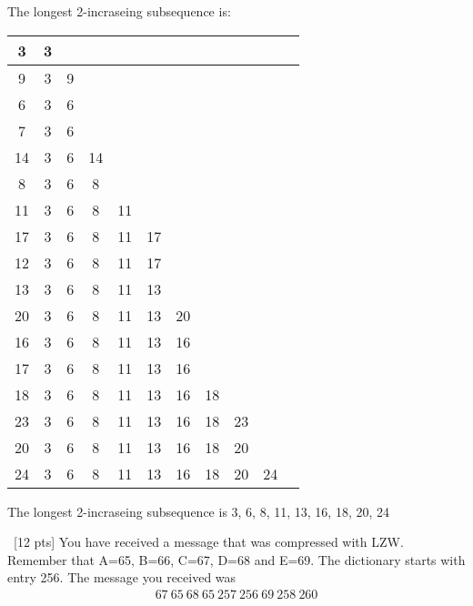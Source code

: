 \documentclass[12pt]{article}
\newenvironment{sol}[1][Solution]{\begin{trivlist}\item[\hskip\labelsep {\bfseries #1:}]}{\end{trivlist}}
\begin{document}
\begin{enumerate}
    The longest 2-incraseing subsequence is:
    \begin{sol}
    \hspace*{\fill}
    \begin{center}
        \begin{tabular}{|c|c|c|c|c|c|c|c|c|c|c|}
        \hline
             3& 3& & & & & & & & & \\
                     \hline
             9& 3& 9 & & & & & & & & \\
                     \hline
             6& 3& 6 & & & & & & & & \\
                     \hline
             7 & 3& 6& & & & & & & & \\
                     \hline
             14 & 3& 6& 14& & & & & & & \\
                     \hline
             8& 3& 6& 8 & & & & & & & \\
                     \hline
             11& 3&6 &8 & 11& & & & & & \\
                     \hline
             17 & 3& 6 & 8 &11 &17 & &  & & & \\
                     \hline
             12 & 3& 6 & 8& 11&17 & & & & & \\
                     \hline
             13&  3& 6&8 & 11& 13& & & & & \\
                     \hline
             20 & 3&6 &8 &11 &13 & 20& & & & \\
                     \hline
             16& 3&6 &8 &11 &13 &16 &&  & & \\
                     \hline
             17 & 3&6 &8 &11 & 13&16 & & & & \\
                     \hline
             18&  3&6 &8 &11 &13 & 16&18 & & & \\
                     \hline
             23 & 3&6 &8 &11 & 13&16 &18 &23 & & \\
                     \hline
             20&  3&6 &8 &11 & 13&16 &18 & 20& & \\
                     \hline
             24&  3&6 &8 &11 & 13&16 &18 &20 & 24 & \\
                     \hline
        \end{tabular}
    \end{center}
    The longest 2-incraseing subsequence is 3, 6, 8, 11, 13, 16, 18, 20, 24 
    \end{sol}

    \item \ [12 pts] You have received a message that was compressed with LZW. Remember that A=65, B=66, C=67, D=68 and E=69. The dictionary starts with entry 256. The message you received was
    \begin{align*}
        67 \ 65  \ 68 \ 65 \ 257 \ 256 \ 69 \ 258 \ 260 
    \end{align*}


\end{enumerate}
\end{document}
